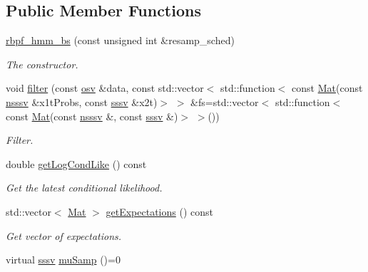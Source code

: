 \subsection*{Public Member Functions}
\begin{DoxyCompactItemize}
\item 
\hyperlink{classrbpf__hmm__bs_aee5c10d320f7c4d2cf2a3f230fca4f18}{rbpf\+\_\+hmm\+\_\+bs} (const unsigned int \&resamp\+\_\+sched)
\begin{DoxyCompactList}\small\item\em The constructor. \end{DoxyCompactList}\item 
void \hyperlink{classrbpf__hmm__bs_ab04815be8324ccd196427ca95ddf2476}{filter} (const \hyperlink{classrbpf__hmm__bs_a9a830ec4bbd37d4922011165aa5a8037}{osv} \&data, const std\+::vector$<$ std\+::function$<$ const \hyperlink{classrbpf__hmm__bs_a8f6996a1394c31ac65859de96f195f3a}{Mat}(const \hyperlink{classrbpf__hmm__bs_ad348eec8ba6e192775ff7a7b4a288809}{nsssv} \&x1t\+Probs, const \hyperlink{classrbpf__hmm__bs_aba47e4a45bf4ac6913f4419f9512f97f}{sssv} \&x2t)$>$ $>$ \&fs=std\+::vector$<$ std\+::function$<$ const \hyperlink{classrbpf__hmm__bs_a8f6996a1394c31ac65859de96f195f3a}{Mat}(const \hyperlink{classrbpf__hmm__bs_ad348eec8ba6e192775ff7a7b4a288809}{nsssv} \&, const \hyperlink{classrbpf__hmm__bs_aba47e4a45bf4ac6913f4419f9512f97f}{sssv} \&)$>$ $>$())
\begin{DoxyCompactList}\small\item\em Filter. \end{DoxyCompactList}\item 
double \hyperlink{classrbpf__hmm__bs_a0c66c15cb50c5fcd35e68f05092a66f0}{get\+Log\+Cond\+Like} () const 
\begin{DoxyCompactList}\small\item\em Get the latest conditional likelihood. \end{DoxyCompactList}\item 
std\+::vector$<$ \hyperlink{classrbpf__hmm__bs_a8f6996a1394c31ac65859de96f195f3a}{Mat} $>$ \hyperlink{classrbpf__hmm__bs_a4ce1bdcfdebab7410594b8d556444e00}{get\+Expectations} () const 
\begin{DoxyCompactList}\small\item\em Get vector of expectations. \end{DoxyCompactList}\item 
virtual \hyperlink{classrbpf__hmm__bs_aba47e4a45bf4ac6913f4419f9512f97f}{sssv} \hyperlink{classrbpf__hmm__bs_a355305cfff93ccaaccf795481721ab6f}{mu\+Samp} ()=0

\end{DoxyCompactItemize}
